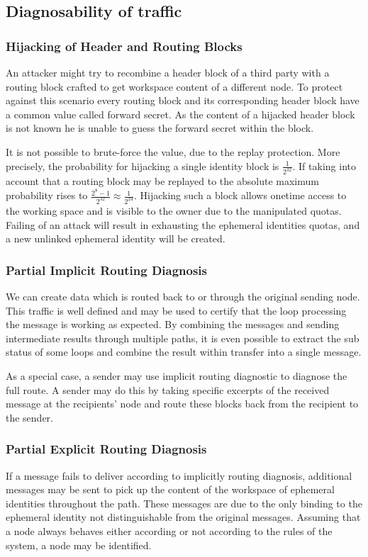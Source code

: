 \subsection{Diagnosability of traffic}

\subsubsection{Hijacking of Header and Routing Blocks}
An attacker might try to recombine a header block of a third party with a routing block crafted to get workspace content of a different node. To protect against this scenario every routing block and its corresponding header block have a common value called forward secret. As the content of a hijacked header block is not known he is unable to guess the forward secret within the block.

It is not possible to brute-force the value, due to the replay protection. More precisely, the probability for hijacking a single identity block is $\frac{1}{2^{32}}$. If taking into account that a routing block may be replayed to the absolute maximum probability rises to $\frac{2^8-1}{2^{32}}\approx\frac{1}{2^{24}}$. Hijacking such a block allows onetime access to the working space and is visible to the owner due to the manipulated quotas. Failing of an attack will result in exhausting the ephemeral identities quotas, and a new unlinked ephemeral identity will be created. 


\subsubsection{Partial Implicit Routing Diagnosis}
We can create data which is routed back to or through the original sending node. This traffic is well defined and may be used to certify that the loop processing the message is working as expected. By combining the messages and sending intermediate results through multiple paths, it is even possible to extract the sub status of some loops and combine the result within transfer into a single message.

As a special case, a sender may use implicit routing diagnostic to diagnose the full route. A sender may do this by taking specific excerpts of the received message at the recipients' node and route these blocks back from the recipient to the sender. 

\subsubsection{Partial Explicit Routing Diagnosis}
If a message fails to deliver according to implicitly routing diagnosis, additional messages may be sent to pick up the content of the workspace of ephemeral identities throughout the path. These messages are due to the only binding to the ephemeral identity not distinguishable from the original messages. Assuming that a node always behaves either according or not according to the rules of the system, a node may be identified.

